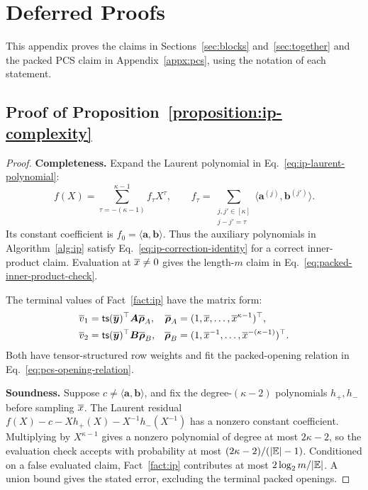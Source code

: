 \section{Deferred Proofs}
\label{appx:proof}
\label{appx:auxiliary-proofs}

This appendix proves the claims in Sections~\ref{sec:blocks}
and~\ref{sec:together} and the packed PCS claim in
Appendix~\ref{appx:pcs}, using the notation of each statement.

\subsection{Proof of Proposition~\ref{proposition:ip-complexity}}
\label{appx:proof-ip}

\begin{proof}
\noindent\textbf{Completeness.}
Expand the Laurent polynomial in Eq.~\eqref{eq:ip-laurent-polynomial}:
\[
    f(X)=
    \sum_{\tau=-(\kappa-1)}^{\kappa-1}f_\tau X^\tau,
    \qquad
    f_\tau=
    \sum_{\substack{j,j'\in[\kappa]\\j-j'=\tau}}
       \langle\bm a^{(j)},\bm b^{(j')}\rangle.
\]
Its constant coefficient is \(f_0=\langle\bm a,\bm b\rangle\).
Thus the auxiliary polynomials in Algorithm~\ref{alg:ip}
satisfy Eq.~\eqref{eq:ip-correction-identity} for a correct
inner-product claim. Evaluation at \(\overline{x}\neq0\) gives the
length-\(m\) claim in
Eq.~\eqref{eq:packed-inner-product-check}.

The terminal values of Fact~\ref{fact:ip} have the matrix form:
\[
\begin{aligned}
    \overline{v}_1
      &={\sf ts}(\overline{\bm y})^\top\bm A\overline{\bm\rho}_A,
    &\overline{\bm\rho}_A
      &=(1,\overline{x},\ldots,\overline{x}^{\kappa-1})^\top,\\
    \overline{v}_2
      &={\sf ts}(\overline{\bm y})^\top\bm B\overline{\bm\rho}_B,
    &\overline{\bm\rho}_B
      &=(1,\overline{x}^{-1},\ldots,\overline{x}^{-(\kappa-1)})^\top.
\end{aligned}
\]
Both have tensor-structured row weights and fit the
packed-opening relation in Eq.~\eqref{eq:pcs-opening-relation}.

\smallskip\noindent\textbf{Soundness.}
Suppose \(c\neq\langle\bm a,\bm b\rangle\), and fix the
degree-\((\kappa-2)\) polynomials \(h_+,h_-\) before sampling
\(\overline{x}\). The Laurent residual
\(f(X)-c-Xh_+(X)-X^{-1}h_-(X^{-1})\) has a nonzero
constant coefficient. Multiplying by
\(X^{\kappa-1}\) gives a nonzero polynomial of degree at most
\(2\kappa-2\), so the evaluation check accepts with probability
at most \((2\kappa-2)/(|\mathbb{E}|-1)\).
Conditioned on a false evaluated claim, Fact~\ref{fact:ip}
contributes at most \(2\log_2m/|\mathbb{E}|\).
A union bound gives the stated error, excluding the terminal
packed openings.


\end{proof}
